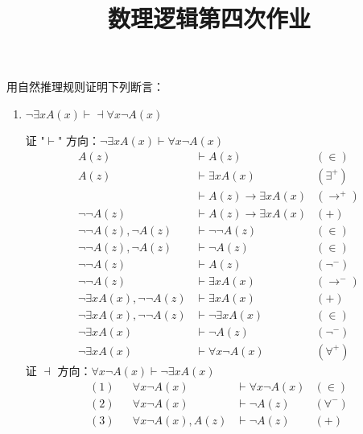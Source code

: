 \documentclass[UTF8]{ctexart}
\date{}
\title{\vspace{-4em} 数理逻辑第四次作业}
\begin{document}
    \maketitle

    \section{}
    用自然推理规则证明下列断言：

    \begin{enumerate}
        \item $\lnot \exists x A(x) \vdash \dashv \forall x \lnot A(x)$ \par
        证 "$\vdash$" 方向：$\lnot \exists x A(x) \vdash \forall x \lnot A(x)$
        \begin{align*}
            A(z) & \vdash A(z) & (\in) \\
            A(z) & \vdash \exists x A(x) & (\exists^{+}) \\
            & \vdash A(z) \to \exists x A(x) & (\to^{+}) \\
            \lnot \lnot A(z) & \vdash A(z) \to \exists x A(x) & (+) \\
            \lnot \lnot A(z), \lnot A(z) & \vdash \lnot \lnot A(z) & (\in) \\
            \lnot \lnot A(z), \lnot A(z) & \vdash \lnot A(z) & (\in) \\
            \lnot \lnot A(z) & \vdash A(z) & (\lnot^{-}) \\
            \lnot \lnot A(z) & \vdash \exists x A(x) & (\to^{-}) \\
            \lnot \exists x A(x), \lnot \lnot A(z) & \vdash \exists x A(x) & (+) \\
            \lnot \exists x A(x), \lnot \lnot A(z) & \vdash \lnot \exists x A(x) & (\in) \\
            \lnot \exists x A(x) & \vdash \lnot A(z) & (\lnot^{-}) \\
            \lnot \exists x A(x) & \vdash \forall x \lnot A(x) & (\forall^{+})
        \end{align*}
        证 $\dashv$ 方向：$\forall x \lnot A(x) \vdash \lnot \exists x A(x)$
        \begin{align*}
            (1) && \forall x \lnot A(x) & \vdash \forall x \lnot A(x) & (\in) \\
            (2) && \forall x \lnot A(x) & \vdash \lnot A(z) & (\forall^{-}) \\
            (3) && \forall x \lnot A(x), A(z) & \vdash \lnot A(z) & (+) \\

\end{align*}
\end{enumerate}
\end{document}
